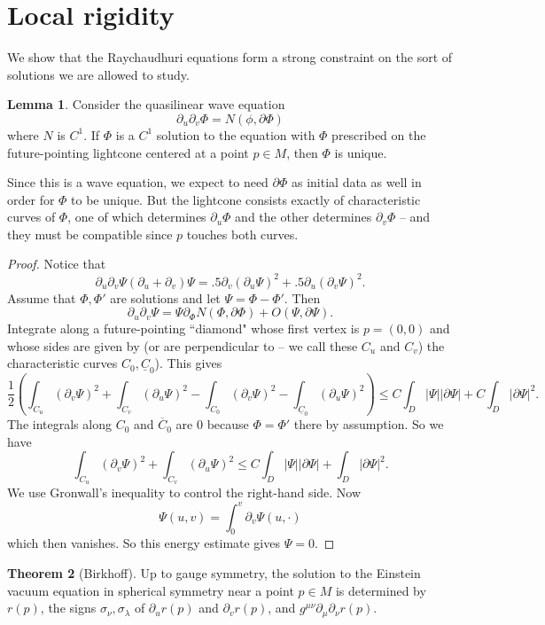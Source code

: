 \documentclass[12pt]{report}
\theoremstyle{definition}
\newtheorem{theorem}{Theorem}[chapter]
\newtheorem{lemma}[theorem]{Lemma}
\theoremstyle{remark}
\begin{document}
\section{Local rigidity}
We show that the Raychaudhuri equations form a strong constraint on the sort of solutions we are allowed to study.
\begin{lemma}
    Consider the quasilinear wave equation
    $$\partial_u\partial_v \Phi = N(\phi, \partial \Phi)$$
    where $N$ is $C^1$. If $\Phi$ is a $C^1$ solution to the equation with $\Phi$ prescribed on the future-pointing lightcone centered at a point $p \in M$, then $\Phi$ is unique.
\end{lemma}
Since this is a wave equation, we expect to need $\partial \Phi$ as initial data as well in order for $\Phi$ to be unique. But the lightcone consists exactly of characteristic curves of $\Phi$, one of which determines $\partial_u \Phi$ and the other determines $\partial_v \Phi$ -- and they must be compatible since $p$ touches both curves.
\begin{proof}
    Notice that
    $$\partial_u \partial_v \Psi (\partial_u + \partial_v) \Psi = .5 \partial_v(\partial_u \Psi)^2 + .5 \partial_u(\partial_v \Psi)^2.$$
    Assume that $\Phi, \Phi'$ are solutions and let $\Psi = \Phi - \Phi'$. Then
    $$\partial_u \partial_v \Psi = \Psi\partial_\Phi N(\Phi, \partial \Phi) +  O(\Psi, \partial \Psi).$$
    Integrate along a future-pointing ``diamond" whose first vertex is $p = (0, 0)$ and whose sides are given by (or are perpendicular to -- we call these $C_u$ and $C_v$) the characteristic curves $C_0, \underline C_0$). This gives
$$\frac{1}{2}\left(\int_{C_u} (\partial_v \Psi)^2 + \int_{C_v} (\partial_u \Psi)^2  - \int_{C_0} (\partial_v \Psi)^2 - \int_{\underline C_0} (\partial_u \Psi)^2 \right) \leq C \int_D |\Psi| |\partial \Psi| + C\int_D |\partial \Psi|^2.$$
    The integrals along $C_0$ and $\overline C_0$ are $0$ because $\Phi = \Phi'$ there by assumption. So we have
    $$\int_{C_u} (\partial_v \Psi)^2 + \int_{C_v} (\partial_u \Psi)^2 \leq C \int_D |\Psi| |\partial \Psi| + \int_D |\partial \Psi|^2.$$
    We use Gronwall's inequality to control the right-hand side. 
    Now
    $$\Psi(u, v) = \int_0^v \partial_v \Psi(u, \cdot)$$
    which then vanishes. So this energy estimate gives $\Psi = 0$.
\end{proof}
\begin{theorem}[Birkhoff]
    Up to gauge symmetry, the solution to the Einstein vacuum equation in spherical symmetry near a point $p \in M$ is determined by $r(p)$, the signs $\sigma_\nu, \sigma_\lambda$ of $\partial_u r(p)$ and $\partial_v r(p)$, and $g^{\mu\nu} \partial_\mu \partial_\nu r(p)$.
\end{theorem}
\end{document}
